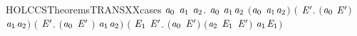 \newcommand{\HOLCCSTheoremsTRANSXXBV}{\UseVerbatim{HOLCCSTheoremsTRANSXXBV}}
\begin{SaveVerbatim}{HOLCCSTheoremsTRANSXXcases}
\HOLTokenTurnstile{} \HOLSymConst{\HOLTokenForall{}}\ensuremath{\HOLBoundVar{a}\sb{\mathrm{0}}} \ensuremath{\HOLBoundVar{a}\sb{\mathrm{1}}} \ensuremath{\HOLBoundVar{a}\sb{\mathrm{2}}}.
       \ensuremath{\HOLBoundVar{a}\sb{\mathrm{0}}} \HOLTokenTransBegin\ensuremath{\HOLBoundVar{a}\sb{\mathrm{1}}}\HOLTokenTransEnd \ensuremath{\HOLBoundVar{a}\sb{\mathrm{2}}} \HOLSymConst{\HOLTokenEquiv{}}
       \ensuremath{(}\ensuremath{\HOLBoundVar{a}\sb{\mathrm{0}}} \HOLSymConst{\ensuremath{=}} \ensuremath{\HOLBoundVar{a}\sb{\mathrm{1}}}\HOLSymConst{\ensuremath{\ldotp}}\ensuremath{\HOLBoundVar{a}\sb{\mathrm{2}}}\ensuremath{)} \HOLSymConst{\HOLTokenDisj{}} \ensuremath{(}\HOLSymConst{\HOLTokenExists{}} \ensuremath{\HOLBoundVar{E}\sp{\prime}}. \ensuremath{(}\ensuremath{\HOLBoundVar{a}\sb{\mathrm{0}}} \HOLSymConst{\ensuremath{=}}  \HOLSymConst{\ensuremath{+}} \ensuremath{\HOLBoundVar{E}\sp{\prime}}\ensuremath{)} \HOLSymConst{\HOLTokenConj{}}  \HOLTokenTransBegin\ensuremath{\HOLBoundVar{a}\sb{\mathrm{1}}}\HOLTokenTransEnd \ensuremath{\HOLBoundVar{a}\sb{\mathrm{2}}}\ensuremath{)} \HOLSymConst{\HOLTokenDisj{}}
       \ensuremath{(}\HOLSymConst{\HOLTokenExists{}} \ensuremath{\HOLBoundVar{E}\sp{\prime}}. \ensuremath{(}\ensuremath{\HOLBoundVar{a}\sb{\mathrm{0}}} \HOLSymConst{\ensuremath{=}} \ensuremath{\HOLBoundVar{E}\sp{\prime}} \HOLSymConst{\ensuremath{+}} \ensuremath{)} \HOLSymConst{\HOLTokenConj{}}  \HOLTokenTransBegin\ensuremath{\HOLBoundVar{a}\sb{\mathrm{1}}}\HOLTokenTransEnd \ensuremath{\HOLBoundVar{a}\sb{\mathrm{2}}}\ensuremath{)} \HOLSymConst{\HOLTokenDisj{}}
       \ensuremath{(}\HOLSymConst{\HOLTokenExists{}} \ensuremath{\HOLBoundVar{E}\sb{\mathrm{1}}} \ensuremath{\HOLBoundVar{E}\sp{\prime}}. \ensuremath{(}\ensuremath{\HOLBoundVar{a}\sb{\mathrm{0}}} \HOLSymConst{\ensuremath{=}}  \HOLSymConst{\ensuremath{\mid}} \ensuremath{\HOLBoundVar{E}\sp{\prime}}\ensuremath{)} \HOLSymConst{\HOLTokenConj{}} \ensuremath{(}\ensuremath{\HOLBoundVar{a}\sb{\mathrm{2}}} \HOLSymConst{\ensuremath{=}} \ensuremath{\HOLBoundVar{E}\sb{\mathrm{1}}} \HOLSymConst{\ensuremath{\mid}} \ensuremath{\HOLBoundVar{E}\sp{\prime}}\ensuremath{)} \HOLSymConst{\HOLTokenConj{}}  \HOLTokenTransBegin\ensuremath{\HOLBoundVar{a}\sb{\mathrm{1}}}\HOLTokenTransEnd \ensuremath{\HOLBoundVar{E}\sb{\mathrm{1}}}\ensuremath{)} \HOLSymConst{\HOLTokenDisj{}}

\end{SaveVerbatim}
